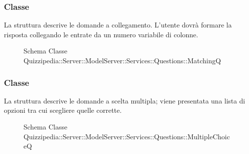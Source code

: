 \subsubsection{Classe }
La struttura descrive le domande a collegamento. L'utente dovrà formare la risposta collegando le entrate da un numero variabile di colonne.
\begin{figure}[H]
\centering
\noindent{}
\caption[Schema Classe MatchingQ]{Schema Classe Quizzipedia::Server::ModelServer::Services::Questions::MatchingQ}
\end{figure}
\subsubsection{Classe }
La struttura descrive le domande a scelta multipla; viene presentata una lista di opzioni tra cui scegliere quelle corrette.
\begin{figure}[H]
\centering
\noindent{}
\caption[Schema Classe MultipleChoiceQ]{Schema Classe Quizzipedia::Server::ModelServer::Services::Questions::MultipleChoiceQ}
\end{figure}

